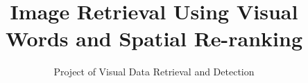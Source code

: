 \documentclass{acm_proc_article-sp}
\begin{document}
\title{Image Retrieval Using Visual Words and Spatial Re-ranking}
\subtitle{Project of Visual Data Retrieval and Detection}
%
%
%
%
%
\end{document}
